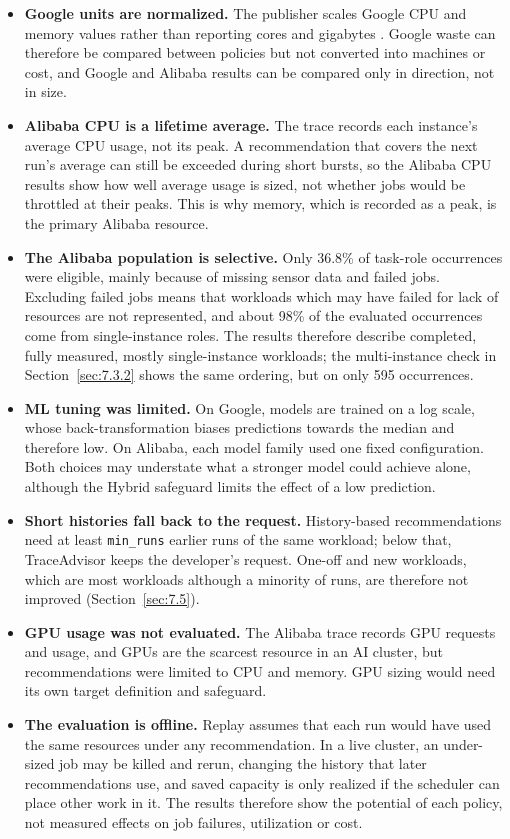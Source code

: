 \documentclass{IEEEtran}
\providecommand{\tightlist}{\setlength{\itemsep}{0pt}\setlength{\parskip}{0pt}}
\begin{document}
\begin{itemize}
\tightlist
\item
  \textbf{Google units are normalized.} The publisher scales Google CPU and memory values rather than reporting cores and gigabytes \cite{ref7}. Google waste can therefore be compared between policies but not converted into machines or cost, and Google and Alibaba results can be compared only in direction, not in size.
\item
  \textbf{Alibaba CPU is a lifetime average.} The trace records each instance's average CPU usage, not its peak. A recommendation that covers the next run's average can still be exceeded during short bursts, so the Alibaba CPU results show how well average usage is sized, not whether jobs would be throttled at their peaks. This is why memory, which is recorded as a peak, is the primary Alibaba resource.
\item
  \textbf{The Alibaba population is selective.} Only 36.8\% of task-role occurrences were eligible, mainly because of missing sensor data and failed jobs. Excluding failed jobs means that workloads which may have failed for lack of resources are not represented, and about 98\% of the evaluated occurrences come from single-instance roles. The results therefore describe completed, fully measured, mostly single-instance workloads; the multi-instance check in Section~\ref{sec:7.3.2} shows the same ordering, but on only 595 occurrences.
\item
  \textbf{ML tuning was limited.} On Google, models are trained on a log scale, whose back-transformation biases predictions towards the median and therefore low. On Alibaba, each model family used one fixed configuration. Both choices may understate what a stronger model could achieve alone, although the Hybrid safeguard limits the effect of a low prediction.
\item
  \textbf{Short histories fall back to the request.} History-based recommendations need at least \texttt{min\_runs} earlier runs of the same workload; below that, TraceAdvisor keeps the developer's request. One-off and new workloads, which are most workloads although a minority of runs, are therefore not improved (Section~\ref{sec:7.5}).
\item
  \textbf{GPU usage was not evaluated.} The Alibaba trace records GPU requests and usage, and GPUs are the scarcest resource in an AI cluster, but recommendations were limited to CPU and memory. GPU sizing would need its own target definition and safeguard.
\item
  \textbf{The evaluation is offline.} Replay assumes that each run would have used the same resources under any recommendation. In a live cluster, an under-sized job may be killed and rerun, changing the history that later recommendations use, and saved capacity is only realized if the scheduler can place other work in it. The results therefore show the potential of each policy, not measured effects on job failures, utilization or cost.
\end{itemize}
\end{document}
